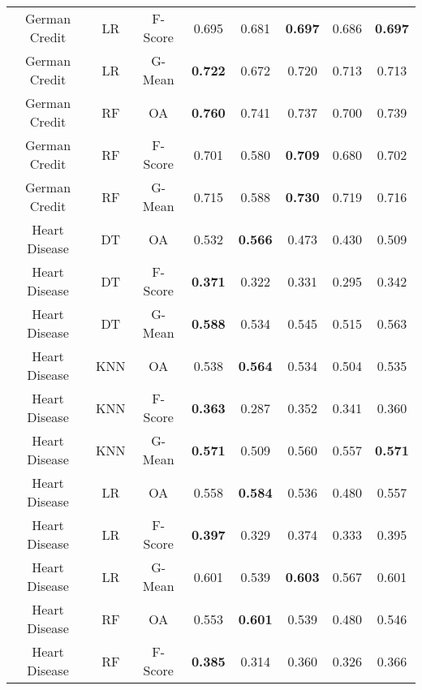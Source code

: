 \begin{longtable}{cccccccc}
  German Credit &         LR & F-Score &          0.695 &          0.681 & \textbf{0.697} &          0.686 & \textbf{0.697} \\
  German Credit &         LR &  G-Mean & \textbf{0.722} &          0.672 &          0.720 &          0.713 &          0.713 \\
  German Credit &         RF &      OA & \textbf{0.760} &          0.741 &          0.737 &          0.700 &          0.739 \\
  German Credit &         RF & F-Score &          0.701 &          0.580 & \textbf{0.709} &          0.680 &          0.702 \\
  German Credit &         RF &  G-Mean &          0.715 &          0.588 & \textbf{0.730} &          0.719 &          0.716 \\
  Heart Disease &         DT &      OA &          0.532 & \textbf{0.566} &          0.473 &          0.430 &          0.509 \\
  Heart Disease &         DT & F-Score & \textbf{0.371} &          0.322 &          0.331 &          0.295 &          0.342 \\
  Heart Disease &         DT &  G-Mean & \textbf{0.588} &          0.534 &          0.545 &          0.515 &          0.563 \\
  Heart Disease &        KNN &      OA &          0.538 & \textbf{0.564} &          0.534 &          0.504 &          0.535 \\
  Heart Disease &        KNN & F-Score & \textbf{0.363} &          0.287 &          0.352 &          0.341 &          0.360 \\
  Heart Disease &        KNN &  G-Mean & \textbf{0.571} &          0.509 &          0.560 &          0.557 & \textbf{0.571} \\
  Heart Disease &         LR &      OA &          0.558 & \textbf{0.584} &          0.536 &          0.480 &          0.557 \\
  Heart Disease &         LR & F-Score & \textbf{0.397} &          0.329 &          0.374 &          0.333 &          0.395 \\
  Heart Disease &         LR &  G-Mean &          0.601 &          0.539 & \textbf{0.603} &          0.567 &          0.601 \\
  Heart Disease &         RF &      OA &          0.553 & \textbf{0.601} &          0.539 &          0.480 &          0.546 \\
  Heart Disease &         RF & F-Score & \textbf{0.385} &          0.314 &          0.360 &          0.326 &          0.366 \\

\end{longtable}
